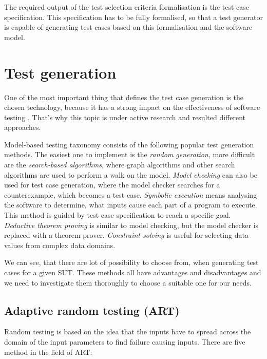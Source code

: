 The required output of the test selection criteria formalisation is the test case specification. This specification has to be fully formalised, so that a test generator is capable of generating test cases based on this formalisation and the software model.


\section{Test generation}
\label{sec:testgeneration}

One of the most important thing that defines the test case generation is the chosen technology, because it has a strong impact on the effectiveness of software testing \cite{testcasegen} \cite{mbttestcasegeneration}. That's why this topic is under active research and resulted different approaches.

Model-based testing taxonomy consists of the following popular test generation methods. The easiest one to implement is the \textit{random generation}, more difficult are the \textit{search-based algorithms}, where graph algorithms and other search algorithms are used to perform a walk on the model. \textit{Model checking} can also be used for test case generation, where the model checker searches for a counterexample, which becomes a test case. \textit{Symbolic execution} means analysing the software to determine, what inputs cause each part of a program to execute. This method is guided by test case specification to reach a specific goal. \textit{Deductive theorem proving} is similar to model checking, but the model checker is replaced with a theorem prover. \textit{Constraint solving} is useful for selecting data values from complex data domains.

We can see, that there are lot of possibility to choose from, when generating test cases for a given SUT. These methods all have advantages and disadvantages and we need to investigate them thoroughly to choose a suitable one for our needs.

\subsection{Adaptive random testing (ART)}
\label{sub:randomtesting}

Random testing is based on the idea that the inputs have to spread across the domain of the input parameters to find failure causing inputs. There are five method in the field of ART:

